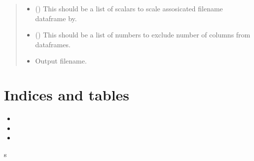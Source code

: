 \documentclass[letterpaper,10pt,english]{sphinxmanual}
\begin{document}
\begin{fulllineitems}
\begin{quote}
\begin{description}
\begin{itemize}
\item {} 
 (\sphinxstyleliteralemphasis{\sphinxupquote{{[}}}\sphinxstyleliteralemphasis{\sphinxupquote{{]}}}\sphinxstyleliteralemphasis{\sphinxupquote{}}) \textendash{} This should be a list of scalars to scale assosicated filename dataframe by.

\item {} 
 (\sphinxstyleliteralemphasis{\sphinxupquote{{[}}}\sphinxstyleliteralemphasis{\sphinxupquote{{]}}}\sphinxstyleliteralemphasis{\sphinxupquote{}}) \textendash{} This should be a list of numbers to exclude number of columns from dataframes.

\item {} 
 \textendash{} Output filename.

\end{itemize}

\end{description}\end{quote}

\end{fulllineitems}



\chapter{Indices and tables}
\label{\detokenize{index:indices-and-tables}}\begin{itemize}
\item {} 

\item {} 

\item {} 

\end{itemize}


\renewcommand{\indexname}{Python Module Index}
\begin{sphinxtheindex}
\def\bigletter#1{{\Large\sffamily#1}\nopagebreak\vspace{1mm}}
\bigletter{s}
\item {}
\end{sphinxtheindex}

\renewcommand{\indexname}{Index}
\printindex
\end{document}
